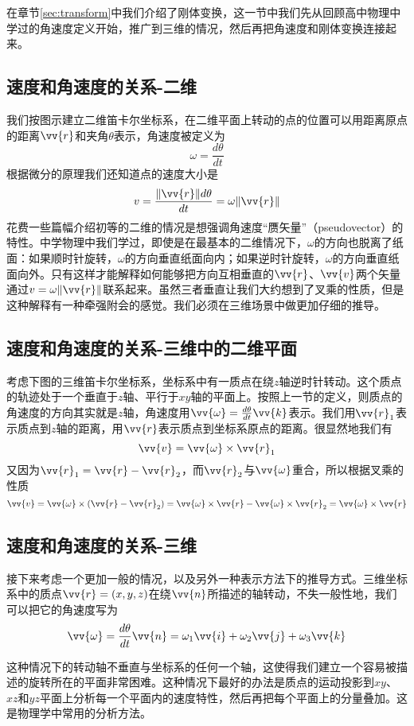 \documentclass[11pt]{article}
\begin{document}
在章节\ref{sec:transform}中我们介绍了刚体变换，这一节中我们先从回顾高中物理中学过的角速度定义开始，推广到三维的情况，然后再把角速度和刚体变换连接起来。
\subsection{速度和角速度的关系-二维}	
我们按图示建立二维笛卡尔坐标系，在二维平面上转动的点的位置可以用距离原点的距离$\vv{r}$和夹角$\theta$表示，角速度被定义为
$$
\omega = \frac{d\theta}{dt}
$$
根据微分的原理我们还知道点的速度大小是
$$
v = \frac{\|\vv{r}\|d\theta}{dt} = \omega \|\vv{r}\|
$$
花费一些篇幅介绍初等的二维的情况是想强调角速度“赝矢量”（pseudovector）的特性。中学物理中我们学过，即使是在最基本的二维情况下，$\omega$的方向也脱离了纸面：如果顺时针旋转，$\omega$的方向垂直纸面向内；如果逆时针旋转，$\omega$的方向垂直纸面向外。只有这样才能解释如何能够把方向互相垂直的$\vv{r}$、$\vv{v}$两个矢量通过$v = \omega \|\vv{r}\|$联系起来。虽然三者垂直让我们大约想到了叉乘的性质，但是这种解释有一种牵强附会的感觉。我们必须在三维场景中做更加仔细的推导。

\subsection{速度和角速度的关系-三维中的二维平面}	\label{sec:velandw}
考虑下图的三维笛卡尔坐标系，坐标系中有一质点在绕$z$轴逆时针转动。这个质点的轨迹处于一个垂直于$z$轴、平行于$xy$轴的平面上。按照上一节的定义，则质点的角速度的方向其实就是$z$轴，角速度用$\vv{\omega} = \frac{d\theta}{dt}\vv{k}$表示。我们用$\vv{r}_1$表示质点到$z$轴的距离，用$\vv{r}$表示质点到坐标系原点的距离。很显然地我们有
$$
\vv{v} = \vv{\omega} \times \vv{r}_1
$$
又因为$\vv{r}_1 = \vv{r} - \vv{r}_2$，而$\vv{r}_2$与$\vv{\omega}$重合，所以根据叉乘的性质
$$
\vv{v} = \vv{\omega} \times (\vv{r} - \vv{r}_2) = \vv{\omega} \times \vv{r} - \vv{\omega} \times \vv{r}_2 = \vv{\omega} \times \vv{r}
$$
\subsection{速度和角速度的关系-三维}\label{sec:velandangular3d}
接下来考虑一个更加一般的情况，以及另外一种表示方法下的推导方式。三维坐标系中的质点$\vv{r} = (x,y,z)$在绕$\vv{n}$所描述的轴转动，不失一般性地，我们可以把它的角速度写为
\begin{equation}\label{eqn:omegadef}
\vv{\omega} = \frac{d\theta}{dt}\vv{n} = \omega_1\vv{i}+\omega_2\vv{j}+\omega_3\vv{k}
\end{equation}

这种情况下的转动轴不垂直与坐标系的任何一个轴，这使得我们建立一个容易被描述的旋转所在的平面非常困难。这种情况下最好的办法是质点的运动投影到$xy$、$xz$和$yz$平面上分析每一个平面内的速度特性，然后再把每个平面上的分量叠加。这是物理学中常用的分析方法。
\end{document}
